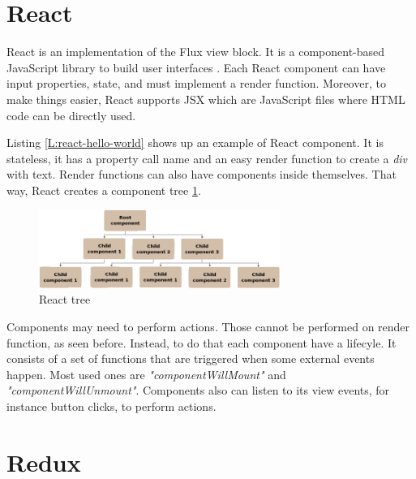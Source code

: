 \section{React}

React is an implementation of the Flux view block. It is a component-based 
JavaScript library to build user interfaces \cite{react-web}. Each React
component can have input properties, state, and must implement a render
function. Moreover, to make things easier, React supports JSX which are
JavaScript files where HTML code can be directly used.

\begin{codefigure}
\end{codefigure}

Listing \ref{L:react-hello-world} shows up an example of React component. It is
stateless, it has a property call name and an easy render function to create a
\textit{div} with text. Render functions can also have components inside
themselves. That way, React creates a component tree \ref{F:react-tree}.

\begin{figure}[htb]
	\begin{center}
		\includegraphics[width=0.7\textwidth]{./figures/react-tree.png}
		\caption{React tree}
		\label{F:react-tree}
	\end{center}
\end{figure}

Components may need to perform actions. Those cannot be performed on render 
function, as seen before. Instead, to do that each component have a lifecyle.
It consists of a set of functions that are triggered when some external events
happen. Most used ones are \textit{"componentWillMount"} and 
\textit{"componentWillUnmount"}. Components also can listen to its view
events, for instance button clicks, to perform actions.

\section{Redux}

